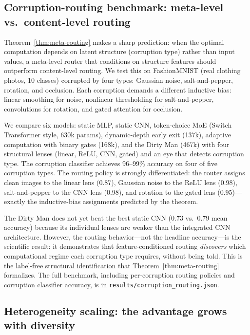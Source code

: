 \documentclass[11pt,a4paper]{article}
\begin{document}
\subsection{Corruption-routing benchmark: meta-level vs.\ content-level routing}
\label{sec:corruption-benchmark}

Theorem~\ref{thm:meta-routing} makes a sharp prediction: when the optimal
computation depends on latent structure (corruption type) rather than input
values, a meta-level router that conditions on structure features should
outperform content-level routing. We test this on FashionMNIST (real clothing
photos, 10 classes) corrupted by four types: Gaussian noise, salt-and-pepper,
rotation, and occlusion. Each corruption demands a different inductive bias:
linear smoothing for noise, nonlinear thresholding for salt-and-pepper,
convolutions for rotation, and gated attention for occlusion.

We compare six models: static MLP, static CNN, token-choice MoE (Switch
Transformer style, 630k params), dynamic-depth early exit (137k), adaptive
computation with binary gates (168k), and the Dirty Man (467k) with four
structural lenses (linear, ReLU, CNN, gated) and an eye that detects
corruption type. The corruption classifier achieves 96--99\% accuracy on four
of five corruption types. The routing policy is strongly differentiated: the
router assigns clean images to the linear lens (0.87), Gaussian noise to the
ReLU lens (0.98), salt-and-pepper to the CNN lens (0.98), and rotation to the
gated lens (0.95)---exactly the inductive-bias assignments predicted by the
theorem.

The Dirty Man does not yet beat the best static CNN (0.73 vs.\ 0.79 mean
accuracy) because its individual lenses are weaker than the integrated CNN
architecture. However, the routing behavior---not the headline accuracy---is
the scientific result: it demonstrates that feature-conditioned routing
\emph{discovers} which computational regime each corruption type requires,
without being told. This is the label-free structural identification that
Theorem~\ref{thm:meta-routing} formalizes. The full benchmark, including
per-corruption routing policies and corruption classifier accuracy, is in
\texttt{results/corruption\_routing.json}.

\subsection{Heterogeneity scaling: the advantage grows with diversity}
\label{sec:heterogeneity-scaling}
\end{document}
